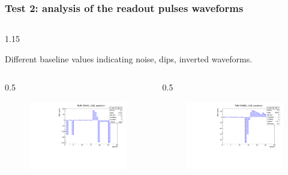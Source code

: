\documentclass{beamer}
\begin{document}
 
\begin{frame}
    \frametitle{Test 2: analysis of the readout pulses waveforms}
    \vspace{-4mm}
    \begin{columns}
\begin{column}{1.15\framewidth}
    \setlength{\leftmargini}{1.2em}
 \begin{itemize}
{\small \item Different baseline values indicating noise, dips, inverted waveforms.}
  \end{itemize}
    \end{column}
    \end{columns}
        \vspace{-3mm}
    \begin{columns}
\begin{column}{0.5\framewidth}
         \begin{figure}[!h]
      \centering
      \hspace*{-2em}
      \includegraphics[width=\columnwidth]{figures/pdf/wf_ch58_1.pdf}
     \label{fig:normalhits}
\end{figure}
\end{column}
\begin{column}{0.5\framewidth}
      \begin{figure}[!h]
      \centering
            \hspace*{-1em}
\includegraphics[width=\columnwidth]{figures/pdf/wf_ch50_1.pdf}

\end{figure}
\end{column}
\end{columns}
\end{frame}
\end{document}
